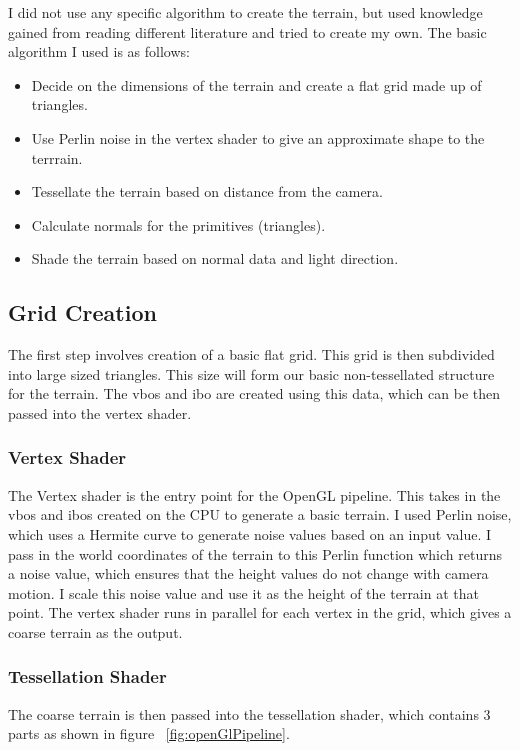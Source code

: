 \documentclass[annual]{acmsiggraph}
\begin{document}
I did not use any specific algorithm to create the terrain, but used knowledge gained from reading different literature and tried to create my own. The basic algorithm I used is as follows:
\begin{itemize}
\item Decide on the dimensions of the terrain and create a flat grid made up of triangles.
\item Use Perlin noise in the vertex shader to give an approximate shape to the terrrain.
\item Tessellate the terrain based on distance from the camera.
\item Calculate normals for the primitives (triangles).
\item Shade the terrain based on normal data and light direction.
\end{itemize}

\subsection{Grid Creation}
The first step involves creation of a basic flat grid. This grid is then subdivided into large sized triangles. This size will form our basic non-tessellated structure for the terrain. The vbos and ibo are created using this data, which can be then passed into the vertex shader.

\subsubsection*{Vertex Shader}
The Vertex shader is the entry point for the OpenGL pipeline. This takes in the vbos and ibos created on the CPU to generate a basic terrain. I used Perlin noise, which uses a Hermite curve to generate noise values based on an input value. I pass in the world coordinates of the terrain to this Perlin function which returns a noise value, which ensures that the height values do not change with camera motion. I scale this noise value and use it as the height of the terrain at that point. The vertex shader runs in parallel for each vertex in the grid, which gives a coarse terrain as the output.

\subsubsection*{Tessellation Shader}
The coarse terrain is then passed into the tessellation shader, which contains 3 parts as shown in figure ~\ref{fig:openGlPipeline}.
\end{document}

